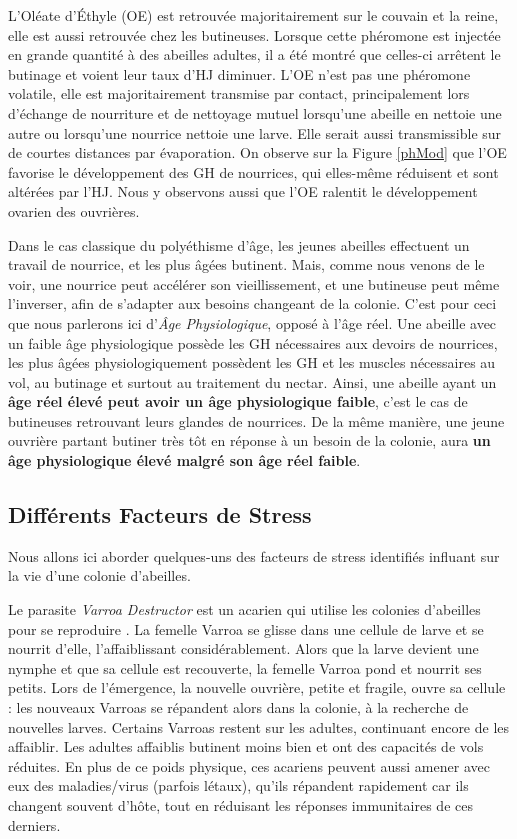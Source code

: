 			 L'Oléate d'Éthyle (OE) est retrouvée majoritairement sur le couvain et la reine, elle est aussi retrouvée chez les butineuses. Lorsque cette phéromone est injectée en grande quantité à des abeilles adultes, il a été montré que celles-ci arrêtent le butinage et voient leur taux d'HJ diminuer. L'OE n'est pas une phéromone volatile, elle est majoritairement transmise par contact, principalement lors d'échange de nourriture et de nettoyage mutuel lorsqu'une abeille en nettoie une autre ou lorsqu'une nourrice nettoie une larve. Elle serait aussi transmissible sur de courtes distances par évaporation. On observe sur la Figure \ref{phMod} que l'OE favorise le développement des GH de nourrices, qui elles-même réduisent et sont altérées par l'HJ. Nous y observons aussi que l'OE ralentit le développement ovarien des ouvrières.
			 
			 Dans le cas classique du polyéthisme d'âge, les jeunes abeilles effectuent un travail de nourrice, et les plus âgées butinent. Mais, comme nous venons de le voir, une nourrice peut accélérer son vieillissement, et une butineuse peut même l'inverser, afin de s'adapter aux besoins changeant de la colonie. C'est pour ceci que nous parlerons ici d'\textit{Âge Physiologique}, opposé à l'âge réel. Une abeille avec un faible âge physiologique possède les GH nécessaires aux devoirs de nourrices, les plus âgées physiologiquement possèdent les GH et les muscles nécessaires au vol, au butinage et surtout au traitement du nectar. Ainsi, une abeille ayant un \textbf{âge réel élevé peut avoir un âge physiologique faible}, c'est le cas de butineuses retrouvant leurs glandes de nourrices. De la même manière, une jeune ouvrière partant butiner très tôt en réponse à un besoin de la colonie, aura \textbf{un âge physiologique élevé malgré son âge réel faible}.
			
		\subsection{Différents Facteurs de Stress}
		Nous allons ici aborder quelques-uns des facteurs de stress identifiés influant sur la vie d'une colonie d'abeilles.
		
		Le parasite \textit{Varroa Destructor} est un acarien qui utilise les colonies d'abeilles pour se reproduire \cite{le_conte_varroa_2010}. La femelle Varroa se glisse dans une cellule de larve et se nourrit d'elle, l'affaiblissant considérablement. Alors que la larve devient une nymphe et que sa cellule est recouverte, la femelle Varroa pond et nourrit ses petits. Lors de l'émergence, la nouvelle ouvrière, petite et fragile, ouvre sa cellule : les nouveaux Varroas se répandent alors dans la colonie, à la recherche de nouvelles larves. Certains Varroas restent sur les adultes, continuant encore de les affaiblir. Les adultes affaiblis butinent moins bien et ont des capacités de vols réduites. En plus de ce poids physique, ces acariens peuvent aussi amener avec eux des maladies/virus (parfois létaux), qu'ils répandent rapidement car ils changent souvent d'hôte, tout en réduisant les réponses immunitaires de ces derniers.
		
